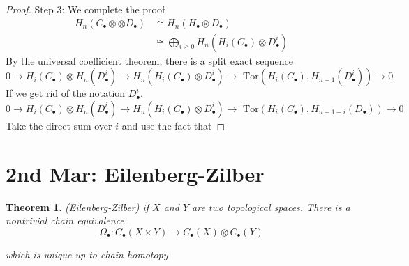 \documentclass[11pt]{article}
\newtheorem{thm}{Theorem}[section]
\newcommand{\tor}{\text{ Tor}}
\newcommand{\lrta}{\longrightarrow}
\begin{document}
\begin{proof}
Step 3: We complete the proof
$$
\begin{aligned}
H_n(C_\bullet \otimes \otimes D_\bullet)&\cong H_n(H_\bullet\otimes D_\bullet)\\
&\cong \bigoplus_{i\geq 0} H_n(H_i(C_\bullet)\otimes D_\bullet^i)
\end{aligned}
$$
By the universal coefficient theorem, there is a split exact sequence
$$
0\lrta H_i(C_\bullet)\otimes H_n(D^i_\bullet)\lrta H_n(H_i(C_\bullet)\otimes D^i_\bullet)\lrta \tor(H_i (C_\bullet),H_{n-1}(D^i_\bullet))\lrta 0
$$
If we get rid of the notation $D^i_\bullet$.
$$0\lrta H_i(C_\bullet)\otimes H_n(D^i_\bullet)\lrta H_n(H_i(C_\bullet)\otimes D^i_\bullet)\lrta \tor(H_i (C_\bullet),H_{n-1-i}(D_\bullet))\lrta 0
$$
Take the direct sum over $i$ and use the fact that 


\end{proof}


\section{2nd Mar: Eilenberg-Zilber}

\begin{thm}
(Eilenberg-Zilber) if $X$ and $Y$ are two topological spaces. There is a nontrivial chain equivalence
$$
\Omega_\bullet: C_\bullet(X\times Y)\lrta C_\bullet(X)\otimes C_\bullet (Y)
$$

which is unique up to chain homotopy
\end{thm}
\end{document}
